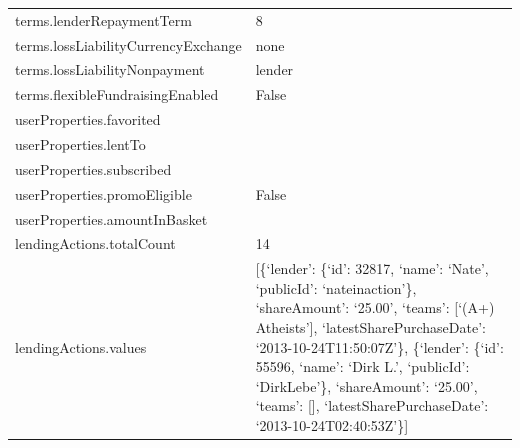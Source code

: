 \begin{longtable}{|p{}|p{}|}
	terms.lenderRepaymentTerm                       & 8                                                                                                             \\
	terms.lossLiabilityCurrencyExchange             & none                                                                                                          \\
	terms.lossLiabilityNonpayment                   & lender                                                                                                        \\
	terms.flexibleFundraisingEnabled                & False                                                                                                         \\
	userProperties.favorited                        &                                                                                                               \\
	userProperties.lentTo                           &                                                                                                               \\
	userProperties.subscribed                       &                                                                                                               \\
	userProperties.promoEligible                    & False                                                                                                         \\
	userProperties.amountInBasket                   &                                                                                                               \\
	lendingActions.totalCount                       & 14                                                                                                            \\
	lendingActions.values                           & {[}\{`lender': \{`id': 32817, `name': `Nate',
	`publicId': `nateinaction'\}, `shareAmount': `25.00', `teams': {[}`(A+)
	Atheists'{]}, `latestSharePurchaseDate': `2013-10-24T11:50:07Z'\},
	\{`lender': \{`id': 55596, `name': `Dirk L.', `publicId': `DirkLebe'\},
	`shareAmount': `25.00', `teams': {[}{]}, `latestSharePurchaseDate':
	`2013-10-24T02:40:53Z'\}{]}                                                                                                                                     \\

\end{longtable}
